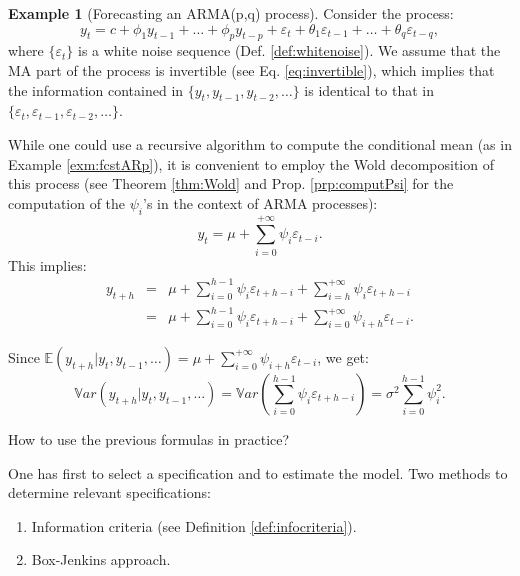 \documentclass[
  11pt,
]{book}
\providecommand{\tightlist}{%
  \setlength{\itemsep}{0pt}\setlength{\parskip}{0pt}}
\theoremstyle{definition}
\theoremstyle{definition}
\newtheorem{example}{Example}[chapter]
\theoremstyle{definition}
\theoremstyle{definition}
\theoremstyle{remark}
\begin{document}
\begin{example}[Forecasting an ARMA(p,q) process]
\protect\hypertarget{exm:fcstARMApq}{}\label{exm:fcstARMApq}Consider the process:
\begin{equation}
y_t = c + \phi_1 y_{t-1} + \dots + \phi_p y_{t-p} + \varepsilon_t + \theta_1 \varepsilon_{t-1} + \dots + \theta_q \varepsilon_{t-q},\label{eq:armaForecast}
\end{equation}
where \(\{\varepsilon_t\}\) is a white noise sequence (Def. \ref{def:whitenoise}). We assume that the MA part of the process is invertible (see Eq. \eqref{eq:invertible}), which implies that the information contained in \(\{y_{t},y_{t-1},y_{t-2},\dots\}\) is identical to that in \(\{\varepsilon_{t},\varepsilon_{t-1},\varepsilon_{t-2},\dots\}\).

While one could use a recursive algorithm to compute the conditional mean (as in Example \ref{exm:fcstARp}), it is convenient to employ the Wold decomposition of this process (see Theorem \ref{thm:Wold} and Prop. \ref{prp:computPsi} for the computation of the \(\psi_i\)'s in the context of ARMA processes):
\[
y_t = \mu + \sum_{i=0}^{+\infty} \psi_i \varepsilon_{t-i}.
\]
This implies:
\begin{eqnarray*}
y_{t+h} &=& \mu + \sum_{i=0}^{h-1} \psi_i \varepsilon_{t+h-i} + \sum_{i=h}^{+\infty} \psi_i \varepsilon_{t+h-i}\\
&=& \mu + \sum_{i=0}^{h-1} \psi_i \varepsilon_{t+h-i} + \sum_{i=0}^{+\infty} \psi_{i+h} \varepsilon_{t-i}.
\end{eqnarray*}

Since \(\mathbb{E}(y_{t+h}|y_t,y_{t-1},\dots)=\mu+\sum_{i=0}^{+\infty} \psi_{i+h} \varepsilon_{t-i}\), we get:
\[
\mathbb{V}ar(y_{t+h}|y_t,y_{t-1},\dots) =\mathbb{V}ar\left(\sum_{i=0}^{h-1} \psi_i \varepsilon_{t+h-i}\right)= \sigma^2 \sum_{i=0}^{h-1} \psi_i^2.
\]
\end{example}

How to use the previous formulas in practice?

One has first to select a specification and to estimate the model.
Two methods to determine relevant specifications:

\begin{enumerate}
\def\labelenumi{\alph{enumi}.}
\tightlist
\item
  Information criteria (see Definition \ref{def:infocriteria}).
\item
  Box-Jenkins approach.
\end{enumerate}
\end{document}
